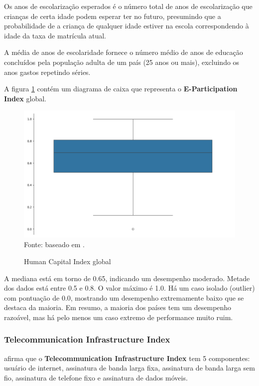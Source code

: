 Os anos de escolarização esperados é o número total de anos de escolarização que crianças de certa idade podem esperar ter no futuro, presumindo que a probabilidade de a criança de qualquer idade estiver na escola correspondendo à idade da taxa de matrícula atual.

A média de anos de escolaridade fornece o número médio de anos de educação concluídos pela população adulta de um país (25 anos ou mais), excluindo os anos gastos repetindo séries. 

A figura \ref{fig:boxplot_hci_global} contém um diagrama de caixa que representa o \textbf{E-Participation Index} global.

\begin{figure}[H]
	\centering
	\caption{Human Capital Index global}
	\includegraphics[width=1\linewidth]{figuras/egdi/boxplot_hci_global.png}
	\label{fig:boxplot_hci_global}
	\footnotesize{Fonte: baseado em \cite{ONU_edgi_mapa}.}
\end{figure}

A mediana está em torno de 0.65, indicando um desempenho moderado. Metade dos dados está entre 0.5 e 0.8. O valor máximo é 1.0. Há um caso isolado (outlier) com pontuação de 0.0, mostrando um desempenho extremamente baixo que se destaca da maioria. Em resumo, a maioria dos países tem um desempenho razoável, mas há pelo menos um caso extremo de performance muito ruim.

\subsubsection{Telecommunication Infrastructure Index}
\label{tii}

\cite{ONU_egdi_methodology} afirma que o \textbf{Telecommunication Infrastructure Index} tem 5 componentes: usuário de internet, assinatura de banda larga fixa, assinatura de banda larga sem fio, assinatura de telefone fixo e assinatura de dados móveis.

